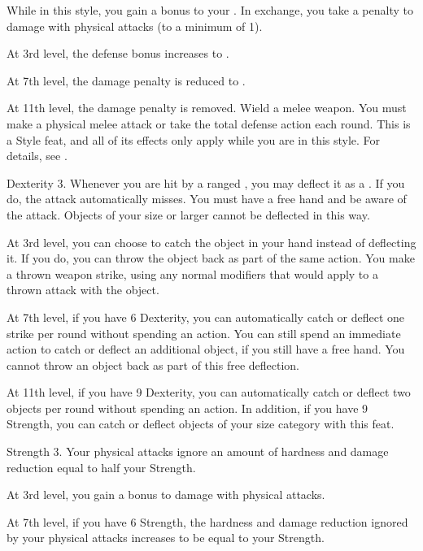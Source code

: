     \featben While in this style, you gain a  bonus to your .
    In exchange, you take a  penalty to damage with physical attacks (to a minimum of 1).

    At 3rd level, the defense bonus increases to .

    At 7th level, the damage penalty is reduced to .

    At 11th level, the damage penalty is removed.
    \stylereq Wield a melee weapon. You must make a physical melee attack or take the total defense action each round.
     This is a Style feat, and all of its effects only apply while you are in this style.
    For details, see .

    \featpres Dexterity 3.
    \featben Whenever you are hit by a ranged , you may deflect it as a .
    If you do, the attack automatically misses.
    You must have a free hand and be aware of the attack.
    Objects of your size or larger cannot be deflected in this way.

    At 3rd level, you can choose to catch the object in your hand instead of deflecting it.
    If you do, you can throw the object back as part of the same action.
    You make a thrown weapon strike, using any normal modifiers that would apply to a thrown attack with the object.

    At 7th level, if you have 6 Dexterity, you can automatically catch or deflect one strike per round without spending an action.
    You can still spend an immediate action to catch or deflect an additional object, if you still have a free hand.
    You cannot throw an object back as part of this free deflection.

    At 11th level, if you have 9 Dexterity, you can automatically catch or deflect two objects per round without spending an action.
    In addition, if you have 9 Strength, you can catch or deflect objects of your size category with this feat.

    \featpres Strength 3.
    \featben Your physical attacks ignore an amount of hardness and damage reduction equal to half your Strength.

    At 3rd level, you gain a  bonus to damage with physical attacks.

    At 7th level, if you have 6 Strength, the hardness and damage reduction ignored by your physical attacks increases to be equal to your Strength.


